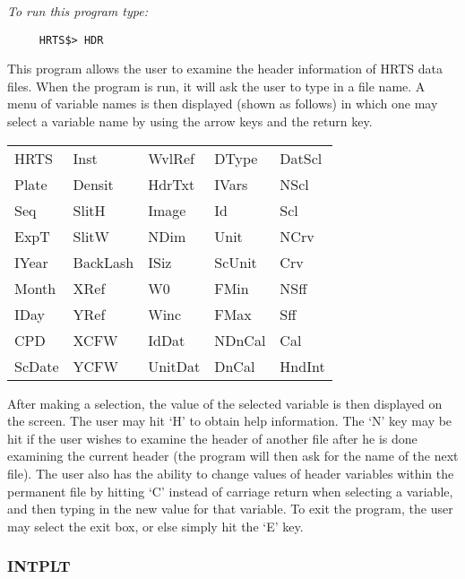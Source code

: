 {\em To run this program type:}
\begin{verbatim}
     HRTS$> HDR                  
\end{verbatim}
  This program allows the user to examine the header information of
  HRTS data files.  When the program is run, it will ask the user to type
  in a file name.  A menu of variable names is then displayed (shown as
  follows) in which one may select a variable name by using the arrow
  keys and the return key.
\begin{center}
\begin{tabular}{||l l l l l ||}
\hline


           HRTS   &     Inst  &     WvlRef  &    DType  &     DatScl \\    
           Plate  &    Densit &     HdrTxt  &    IVars  &     NScl   \\   
           Seq    &    SlitH  &      Image  &      Id   &     Scl    \\   
           ExpT   &    SlitW  &      NDim   &     Unit  &     NCrv   \\   
           IYear  &  BackLash &      ISiz   &    ScUnit &     Crv    \\   
           Month  &     XRef  &       W0    &     FMin  &     NSff   \\   
           IDay   &     YRef  &      Winc   &     FMax  &     Sff    \\   
           CPD    &     XCFW  &      IdDat  &    NDnCal &     Cal    \\   
           ScDate &      YCFW &    UnitDat  &     DnCal &    HndInt  \\   
\hline
\end{tabular}                                        
\end{center}
   After making a selection, the value of the selected variable is then
   displayed on the screen.  The user may hit `H' to obtain help
   information.  The `N' key may be hit if the user wishes to examine the
   header of another file after he is done examining the current header
  (the program will then ask for the name of the next file).  The user
   also has the ability to change values of header variables within the
   permanent file by hitting `C' instead of carriage return when selecting
   a variable, and then typing in the new value for that variable.  To
   exit the program, the user may select the exit box, or else simply hit
   the `E' key.

\subsubsection{INTPLT}

